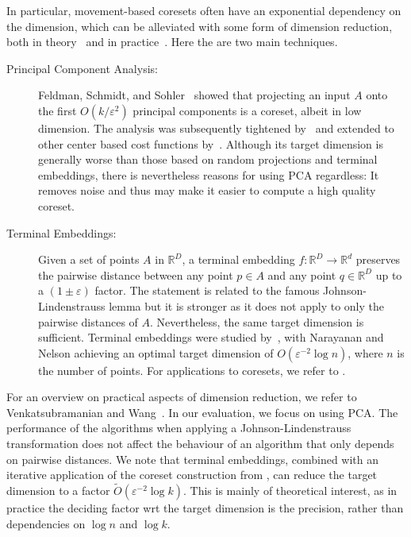 In particular, movement-based coresets often have an exponential dependency on the dimension, which can be alleviated with some form of dimension reduction, both in theory~\cite{SSS19} and in practice~\cite{KappmeierS015}.
Here the are two main techniques.

\begin{description}
\item[Principal Component Analysis:] Feldman, Schmidt, and Sohler~\cite{FSS13} showed that projecting an input $A$ onto the first $O(k/\varepsilon^2)$ principal components is a coreset, albeit in low dimension. The analysis was subsequently tightened by~\cite{CEMMP15} and extended to other center based cost functions by~\cite{SohlerW18}. Although its target dimension is generally worse than those based on random projections and terminal embeddings, there is nevertheless reasons for using PCA regardless: It removes noise and thus may make it easier to compute a high quality coreset.
\item[Terminal Embeddings:] Given a set of points $A$ in $\mathbb{R}^D$, a terminal embedding $f:\mathbb{R}^D\rightarrow \mathbb{R}^d$ preserves the pairwise distance between any point $p\in A$ and any point $q\in \mathbb{R}^D$ up to a $(1\pm \varepsilon)$ factor. The statement is related to the famous Johnson-Lindenstrauss lemma but it is stronger as it does not apply to only the pairwise distances of $A$. Nevertheless, the same target dimension is sufficient. Terminal embeddings were studied by~\cite{ElkinFN17,MahabadiMMR18,NaN18}, with Narayanan and Nelson \cite{NaN18} achieving an optimal target dimension of $O(\varepsilon^{-2}\log n)$, where $n$ is the number of points. For applications to coresets, we refer to \cite{BecchettiBC0S19,Cohen-AddadSS21,huang2020coresets}.
\end{description}

For an overview on practical aspects of dimension reduction, we refer to Venkatsubramanian and Wang~\cite{VenkatasubramanianW11}. In our evaluation, we  focus on using PCA. The performance of the algorithms when applying a Johnson-Lindenstrauss transformation does not affect the behaviour of an algorithm that only depends on pairwise distances. We note that terminal embeddings, combined with an iterative application of the coreset construction from \cite{BravermanJKW21}, can reduce the target dimension to a factor $\tilde{O}(\varepsilon^{-2} \log k)$. This is mainly of theoretical interest, as in practice the deciding factor wrt the target dimension is the precision, rather than dependencies on $\log n$ and $\log k$.